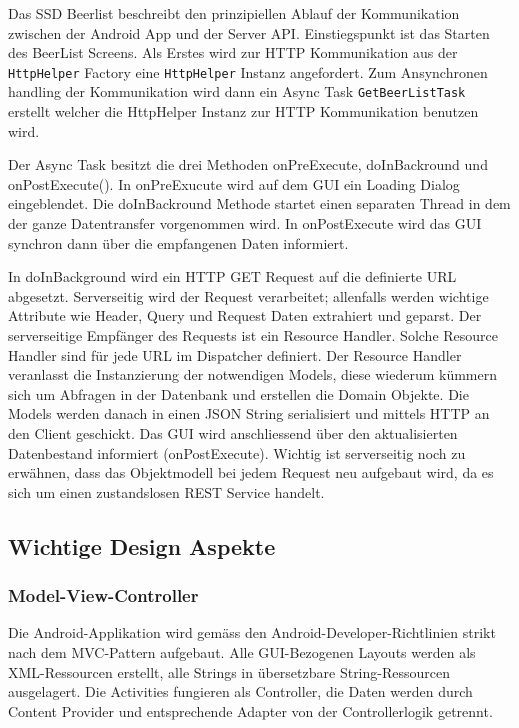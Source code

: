 \documentclass[10pt,a4paper]{scrartcl}
\begin{document}
Das SSD Beerlist beschreibt den prinzipiellen Ablauf der Kommunikation zwischen der Android App und der Server API.  Einstiegspunkt ist das Starten des BeerList Screens. 
Als Erstes wird zur HTTP Kommunikation aus der \texttt{HttpHelper} Factory eine \texttt{HttpHelper} Instanz
angefordert. Zum Ansynchronen handling der Kommunikation wird dann ein Async Task \texttt{GetBeerListTask} erstellt welcher die HttpHelper Instanz zur HTTP Kommunikation benutzen wird. 

Der Async Task besitzt die drei Methoden onPreExecute, doInBackround und onPostExecute().
In onPreExucute wird auf dem GUI ein Loading Dialog eingeblendet. Die doInBackround Methode startet einen separaten Thread in dem der ganze Datentransfer vorgenommen wird.
In onPostExecute wird das GUI synchron dann über die empfangenen Daten informiert.


In doInBackground wird ein HTTP GET Request auf die definierte URL abgesetzt.
Serverseitig wird der Request verarbeitet; allenfalls werden wichtige Attribute wie Header, Query
und Request Daten extrahiert und geparst. Der serverseitige Empfänger des Requests ist ein Resource
Handler. Solche Resource Handler sind für jede URL im Dispatcher definiert.  Der Resource Handler
veranlasst die Instanzierung der notwendigen Models, diese wiederum kümmern sich um Abfragen in der
Datenbank und erstellen die Domain Objekte. Die Models werden danach in einen JSON String
serialisiert und mittels HTTP an den Client geschickt. Das GUI wird anschliessend über den
aktualisierten Datenbestand informiert (onPostExecute). Wichtig ist serverseitig noch zu erwähnen, dass das Objektmodell bei jedem Request neu aufgebaut wird, da es sich um einen zustandslosen REST Service handelt.

\subsection{Wichtige Design Aspekte}

\subsubsection*{Model-View-Controller}

Die Android-Applikation wird gemäss den Android-Developer-Richtlinien strikt nach dem
MVC-Pattern aufgebaut. Alle GUI-Bezogenen Layouts werden als XML-Ressourcen erstellt, alle Strings
in übersetzbare String-Ressourcen ausgelagert. Die Activities fungieren als Controller, die Daten
werden durch Content Provider und entsprechende Adapter von der Controllerlogik getrennt.
\end{document}
